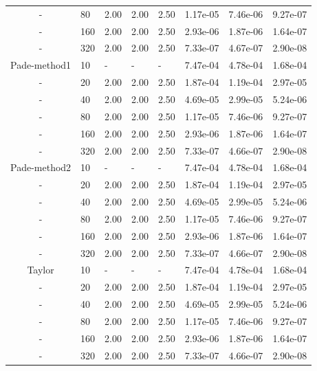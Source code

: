\begin{table}[h]
{\begin{tabular}{clllllll}
   - &   80 & 2.00 & 2.00 & 2.50 & 1.17e-05 & 7.46e-06 & 9.27e-07 \\ 
   - &  160 & 2.00 & 2.00 & 2.50 & 2.93e-06 & 1.87e-06 & 1.64e-07 \\ 
   - &  320 & 2.00 & 2.00 & 2.50 & 7.33e-07 & 4.67e-07 & 2.90e-08 \\ 
   \hline
   Pade-method1 &   10 & - & - & - & 7.47e-04 & 4.78e-04 & 1.68e-04 \\
   - &   20 & 2.00 & 2.00 & 2.50 & 1.87e-04 & 1.19e-04 & 2.97e-05 \\ 
   - &   40 & 2.00 & 2.00 & 2.50 & 4.69e-05 & 2.99e-05 & 5.24e-06 \\ 
   - &   80 & 2.00 & 2.00 & 2.50 & 1.17e-05 & 7.46e-06 & 9.27e-07 \\ 
   - &  160 & 2.00 & 2.00 & 2.50 & 2.93e-06 & 1.87e-06 & 1.64e-07 \\ 
   - &  320 & 2.00 & 2.00 & 2.50 & 7.33e-07 & 4.66e-07 & 2.90e-08 \\ 
   \hline
   Pade-method2 &   10 & - & - & - & 7.47e-04 & 4.78e-04 & 1.68e-04 \\
   - &   20 & 2.00 & 2.00 & 2.50 & 1.87e-04 & 1.19e-04 & 2.97e-05 \\ 
   - &   40 & 2.00 & 2.00 & 2.50 & 4.69e-05 & 2.99e-05 & 5.24e-06 \\ 
   - &   80 & 2.00 & 2.00 & 2.50 & 1.17e-05 & 7.46e-06 & 9.27e-07 \\ 
   - &  160 & 2.00 & 2.00 & 2.50 & 2.93e-06 & 1.87e-06 & 1.64e-07 \\ 
   - &  320 & 2.00 & 2.00 & 2.50 & 7.33e-07 & 4.66e-07 & 2.90e-08 \\ 
   \hline
   Taylor &   10 & - & - & - & 7.47e-04 & 4.78e-04 & 1.68e-04 \\
   - &   20 & 2.00 & 2.00 & 2.50 & 1.87e-04 & 1.19e-04 & 2.97e-05 \\ 
   - &   40 & 2.00 & 2.00 & 2.50 & 4.69e-05 & 2.99e-05 & 5.24e-06 \\ 
   - &   80 & 2.00 & 2.00 & 2.50 & 1.17e-05 & 7.46e-06 & 9.27e-07 \\ 
   - &  160 & 2.00 & 2.00 & 2.50 & 2.93e-06 & 1.87e-06 & 1.64e-07 \\ 
   - &  320 & 2.00 & 2.00 & 2.50 & 7.33e-07 & 4.66e-07 & 2.90e-08 \\ 
   \hline
   \end{tabular}
   }
\end{table}

\clearpage

